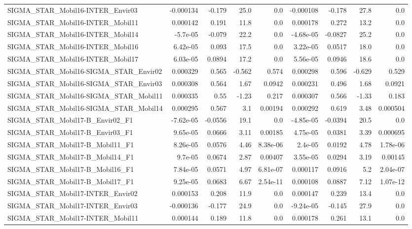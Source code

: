 \begin{tabular}{lrrrrrrrr}
SIGMA_STAR_Mobil16-INTER_Envir03 & -0.000134 & -0.179 & 25.0 & 0.0 & -0.000108 & -0.178 & 27.8 & 0.0 \\
SIGMA_STAR_Mobil16-INTER_Mobil11 & 0.000142 & 0.191 & 11.8 & 0.0 & 0.000178 & 0.272 & 13.2 & 0.0 \\
SIGMA_STAR_Mobil16-INTER_Mobil14 & -5.7e-05 & -0.079 & 22.2 & 0.0 & -4.68e-05 & -0.0827 & 25.2 & 0.0 \\
SIGMA_STAR_Mobil16-INTER_Mobil16 & 6.42e-05 & 0.093 & 17.5 & 0.0 & 3.22e-05 & 0.0517 & 18.0 & 0.0 \\
SIGMA_STAR_Mobil16-INTER_Mobil17 & 6.03e-05 & 0.0894 & 17.2 & 0.0 & 5.56e-05 & 0.0946 & 18.6 & 0.0 \\
SIGMA_STAR_Mobil16-SIGMA_STAR_Envir02 & 0.000329 & 0.565 & -0.562 & 0.574 & 0.000298 & 0.596 & -0.629 & 0.529 \\
SIGMA_STAR_Mobil16-SIGMA_STAR_Envir03 & 0.000308 & 0.564 & 1.67 & 0.0942 & 0.000231 & 0.496 & 1.68 & 0.0921 \\
SIGMA_STAR_Mobil16-SIGMA_STAR_Mobil11 & 0.000335 & 0.55 & -1.23 & 0.217 & 0.000307 & 0.566 & -1.33 & 0.183 \\
SIGMA_STAR_Mobil16-SIGMA_STAR_Mobil14 & 0.000295 & 0.567 & 3.1 & 0.00194 & 0.000292 & 0.619 & 3.48 & 0.000504 \\
SIGMA_STAR_Mobil17-B_Envir02_F1 & -7.62e-05 & -0.0556 & 19.1 & 0.0 & -4.85e-05 & -0.0394 & 20.5 & 0.0 \\
SIGMA_STAR_Mobil17-B_Envir03_F1 & 9.65e-05 & 0.0666 & 3.11 & 0.00185 & 4.75e-05 & 0.0381 & 3.39 & 0.000695 \\
SIGMA_STAR_Mobil17-B_Mobil11_F1 & 8.26e-05 & 0.0576 & 4.46 & 8.38e-06 & 2.4e-05 & 0.0192 & 4.78 & 1.78e-06 \\
SIGMA_STAR_Mobil17-B_Mobil14_F1 & 9.7e-05 & 0.0674 & 2.87 & 0.00407 & 3.55e-05 & 0.0294 & 3.19 & 0.00145 \\
SIGMA_STAR_Mobil17-B_Mobil16_F1 & 7.84e-05 & 0.0571 & 4.97 & 6.81e-07 & 0.000117 & 0.0916 & 5.2 & 2.04e-07 \\
SIGMA_STAR_Mobil17-B_Mobil17_F1 & 9.25e-05 & 0.0683 & 6.67 & 2.54e-11 & 0.000108 & 0.0887 & 7.12 & 1.07e-12 \\
SIGMA_STAR_Mobil17-INTER_Envir02 & 0.000153 & 0.208 & 11.9 & 0.0 & 0.000147 & 0.239 & 13.4 & 0.0 \\
SIGMA_STAR_Mobil17-INTER_Envir03 & -0.000136 & -0.177 & 24.9 & 0.0 & -9.24e-05 & -0.145 & 27.9 & 0.0 \\
SIGMA_STAR_Mobil17-INTER_Mobil11 & 0.000144 & 0.189 & 11.8 & 0.0 & 0.000178 & 0.261 & 13.1 & 0.0 \\

\end{tabular}

